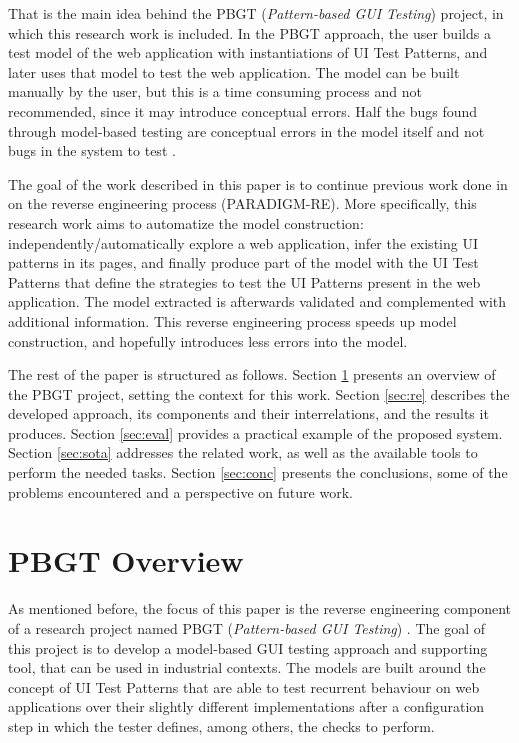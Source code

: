 \documentclass[conference]{IEEEtran}
\begin{document}
That is the main idea behind the PBGT (\textit{Pattern-based GUI Testing}) project, in which this research work is included. In the PBGT approach, the user builds a test model of the web application with instantiations of UI Test Patterns, and later uses that model to test the web application. The model can be built manually by the user, but this is a time consuming process and not recommended, since it may introduce conceptual errors. Half the bugs found through model-based testing are conceptual errors in the model itself and not bugs in the system to test \cite{dalal1999model}.

The goal of the work described in this paper is to continue previous work done in \cite{nabuco2013inferring} on the reverse engineering process (PARADIGM-RE). More specifically, this research work aims to automatize the model construction: independently/automatically explore a web application, infer the existing UI patterns in its pages, and finally produce part of the model with the UI Test Patterns that define the strategies to test the UI Patterns present in the web application. The model extracted is afterwards validated and complemented with additional information. This reverse engineering process speeds up model construction, and hopefully introduces less errors into the model.

The rest of the paper is structured as follows. Section \ref{sec:pbgt} presents an overview of the PBGT project, setting the context for this work.  Section \ref{sec:re} describes the developed approach, its components and  their interrelations, and the results it produces. Section \ref{sec:eval} provides a practical example of the proposed system. Section \ref{sec:sota} addresses the related work, as well as the available tools to perform the needed tasks. Section \ref{sec:conc} presents the conclusions, some of the problems encountered and a perspective on future work. 

\section{PBGT Overview}\label{sec:pbgt}

As mentioned before, the focus of this paper is the reverse engineering component of a research project named PBGT (\textit{Pattern-based GUI Testing}) \cite{moreira2013pattern}. The goal of this project is to develop a model-based GUI testing approach and supporting tool, that can be used in industrial contexts. The models are built around the concept of UI Test Patterns that are able to test recurrent behaviour on web applications over their slightly different implementations after a configuration step in which the tester defines, among others, the checks to perform.
\end{document}

